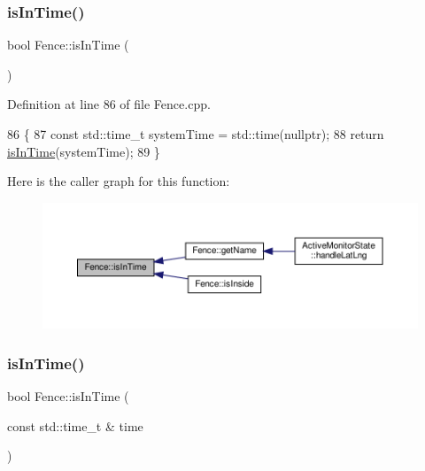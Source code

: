 \subsubsection{\texorpdfstring{is\+In\+Time()}{isInTime()}\hspace{0.1cm}{\footnotesize\ttfamily [1/2]}}
{\footnotesize\ttfamily bool Fence\+::is\+In\+Time (\begin{DoxyParamCaption}{ }\end{DoxyParamCaption})}



Definition at line 86 of file Fence.\+cpp.


\begin{DoxyCode}
86                      \{
87     \textcolor{keyword}{const} std::time\_t systemTime = std::time(\textcolor{keyword}{nullptr});
88     \textcolor{keywordflow}{return} \hyperlink{class_fence_a7695b0f94f461369703188a287a38ab4}{isInTime}(systemTime);
89 \}
\end{DoxyCode}
Here is the caller graph for this function\+:
\nopagebreak
\begin{figure}[H]
\begin{center}
\leavevmode
\includegraphics[width=350pt]{d0/db8/class_fence_a7695b0f94f461369703188a287a38ab4_icgraph}
\end{center}
\end{figure}
\mbox{\label{class_fence_a9d1d90f134dceb2168247cd8454d91f4}} 
\subsubsection{\texorpdfstring{is\+In\+Time()}{isInTime()}\hspace{0.1cm}{\footnotesize\ttfamily [2/2]}}
{\footnotesize\ttfamily bool Fence\+::is\+In\+Time (\begin{DoxyParamCaption}\item[{const std\+::time\+\_\+t \&}]{time }\end{DoxyParamCaption})}



